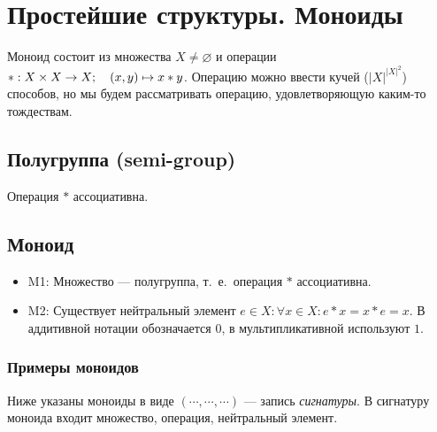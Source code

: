 \documentclass[a4paper]{report}
\begin{document}
    \section{Простейшие структуры. Моноиды}

    Моноид состоит из множества $X \ne \varnothing$ и операции $* : X \times X \rightarrow X;\quad (x, y) \mapsto x * y$.
    Операцию можно ввести кучей ($|X|^{|X|^2}$) способов, но мы будем рассматривать операцию, удовлетворяющую каким-то тождествам.

    \subsection{Полугруппа (semi-group)}

    Операция $*$ ассоциативна.

    \subsection{Моноид}
    \begin{itemize}
        \item M1: Множество --- полугруппа, т.\ е.\ операция $*$ ассоциативна.
        \item M2: Существует нейтральный элемент $e \in X: \forall x \in X : e * x = x * e = x$.
        В аддитивной нотации обозначается $0$, в мультипликативной используют $1$.

    \end{itemize}

    \subsubsection{Примеры моноидов}
    Ниже указаны моноиды в виде $(\cdots, \cdots, \cdots)$ --- запись \textit{сигнатуры}.
    В сигнатуру моноида входит множество, операция, нейтральный элемент.
\end{document}
